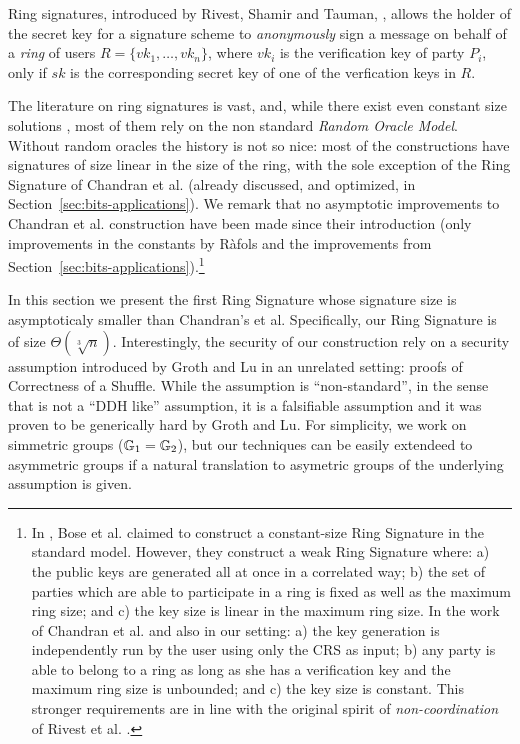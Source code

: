 Ring signatures, introduced by Rivest, Shamir and Tauman, \cite{AC:RivShaTau01}, allows the holder of the secret key for a signature scheme to \emph{anonymously} sign a message on behalf of a \emph{ring} of users $R=\{vk_1,\ldots,vk_n\}$, where $vk_i$ is the verification key of party $P_i$, only if $sk$ is the corresponding secret key of one of the verfication keys in $R$.

The literature on ring signatures is vast, and, while there exist even constant size solutions \cite{EC:DKNS04}, most of them rely on the non standard \emph{Random Oracle Model}. Without random oracles the history is not so nice: most of the constructions have signatures of size linear in the size of the ring, with the sole exception of the Ring Signature of Chandran et al. \cite{ICALP:ChaGroSah07} (already discussed, and optimized, in Section~\ref{sec:bits-applications}). We remark that no asymptotic improvements to Chandran et al. construction have been made since their introduction (only improvements in the constants by R\`afols \cite{TCC:Rafols15} and the improvements from Section~\ref{sec:bits-applications}).\footnote{In \cite{ACISP:BosDasRan15}, Bose et al. claimed to construct a constant-size Ring Signature in the standard model. However, they construct a weak Ring Signature where: a) the public keys are generated all at once in a correlated way; b) the set of parties which are able to participate in a ring is fixed as well as the maximum ring size; and c) the key size is linear in the maximum ring size. In the work of Chandran et al. and also in our setting: a) the key generation is independently run by the user using only the CRS as input; b) any party is able to belong to a ring as long as she has a verification key and the maximum ring size is unbounded; and c) the key size is constant. This stronger requirements are in line with the original spirit of \emph{non-coordination} of  Rivest et al. \cite{AC:RivShaTau01}.}

In this section we present the first Ring Signature whose signature size is asymptoticaly smaller than Chandran's et al. Specifically, our Ring Signature is of size $\Theta(\sqrt[3]{n})$. Interestingly, the security of our construction rely on a security assumption introduced by Groth and Lu \cite{AC:GroLu07} in an unrelated setting: proofs of Correctness of a Shuffle. While the assumption is ``non-standard'', in the sense that is not a ``DDH like'' assumption, it is a falsifiable assumption and it was proven to be generically hard by Groth and Lu. For simplicity, we work on simmetric groups ($\mathbb{G}_1=\mathbb{G}_2$), but our techniques can be easily extendeed to asymmetric groups if a natural translation to asymetric groups of the underlying assumption is given. 

